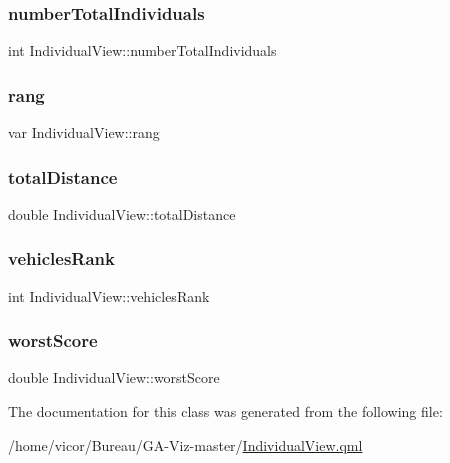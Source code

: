 \subsubsection{\texorpdfstring{number\+Total\+Individuals}{numberTotalIndividuals}}
{\footnotesize\ttfamily int Individual\+View\+::number\+Total\+Individuals}

\mbox{\label{class_individual_view_ae8159ede7a7101e03aaae2cb771f621b}} 
\subsubsection{\texorpdfstring{rang}{rang}}
{\footnotesize\ttfamily var Individual\+View\+::rang}

\mbox{\label{class_individual_view_a8d08885c5f5158cd8c79d8992e705bfb}} 
\subsubsection{\texorpdfstring{total\+Distance}{totalDistance}}
{\footnotesize\ttfamily double Individual\+View\+::total\+Distance}

\mbox{\label{class_individual_view_a29df5add0d513ab175c490278042ce80}} 
\subsubsection{\texorpdfstring{vehicles\+Rank}{vehiclesRank}}
{\footnotesize\ttfamily int Individual\+View\+::vehicles\+Rank}

\mbox{\label{class_individual_view_a65da50c477212f4969c5a2a1e87c1d82}} 
\subsubsection{\texorpdfstring{worst\+Score}{worstScore}}
{\footnotesize\ttfamily double Individual\+View\+::worst\+Score}



The documentation for this class was generated from the following file\+:\begin{DoxyCompactItemize}
\item 
/home/vicor/\+Bureau/\+G\+A-\/\+Viz-\/master/\hyperlink{_individual_view_8qml}{Individual\+View.\+qml}\end{DoxyCompactItemize}
